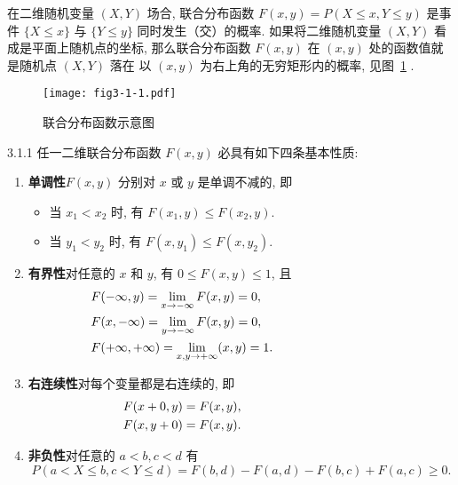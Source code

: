    在二维随机变量 $(X,Y)$ 场合, 联合分布函数 $F(x,y)=P(X\leq x,Y\leq y)$ 是事件 $\{X\leq x\}$ 与 $\{Y \leq y\}$ 同时发生（交）的概率. 
   如果将二维随机变量 $(X,Y)$ 看成是平面上随机点的坐标, 那么联合分布函数 $F(x,y)$ 在 $(x,y)$ 处的函数值就是随机点 $(X, Y)$ 落在
   以 $(x,y)$ 为右上角的无穷矩形内的概率, 见图~\ref{fig:3.1.1} .
   \begin{figure}[htbp]
   	\centering
   	\texttt{[image: fig3-1-1.pdf]}
   	\caption{联合分布函数示意图}\label{fig:3.1.1}
   \end{figure}
   \begin{theorem}{}{3.1.1}
   	任一二维联合分布函数 $F(x,y)$ 必具有如下四条基本性质: 
    \begin{enumerate}
    	\item \textbf{单调性}\quad $F(x,y)$ 分别对 $x$ 或 $y$ 是单调不减的, 即
    	\begin{itemize}
    		\item 当 $x_1<x_2$ 时, 有 $F(x_1,y)\leq F(x_2,y)$.
    		\item 当 $y_1<y_2$ 时, 有 $F(x,y_1)\leq F(x,y_2)$. 
    	\end{itemize}
    	\item \textbf{有界性}\quad 对任意的 $x$ 和 $y$, 有 $0\leq F(x,y) \leq 1$, 且
    	\begin{align*}
    		&F(-\infty,y)=\lim_{x\to -\infty}F(x,y)=0,	&\hspace*{3cm} \\
    		&F(x,-\infty)=\lim_{y\to -\infty}F(x,y)=0,	&\\
    		&F(+\infty,+\infty)=\lim_{x,y\to +\infty}(x,y)=1.&
    	\end{align*}
    	\item \textbf{右连续性}\quad  对每个变量都是右连续的, 即
    		\begin{align*} 
    			F(x+0, y) &=F(x, y), &\hspace*{3cm} \\
    			F(x, y+0) &=F(x, y). &
    		\end{align*}
    	\item \textbf{非负性}\quad 对任意的 $a<b,c<d$ 有
    		\begin{equation*}
    		 	P(a<X \leq b, c<Y \leq d)= F(b, d)-F(a, d)-F(b, c)+ F(a, c) \geq 0 .
    		\end{equation*}
    \end{enumerate}
   \end{theorem}
